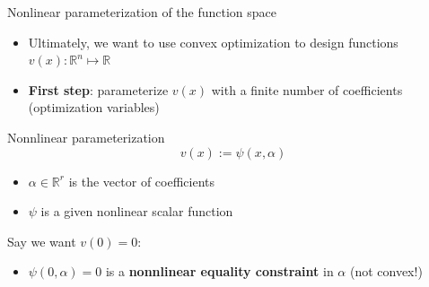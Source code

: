 \documentclass[aspectratio=169]{beamer}
\begin{document}
\begin{frame}{Nonlinear parameterization of the function space}
\begin{itemize}
\item
Ultimately, we want to use convex optimization to design functions $v(x) : \mathbb R^n \mapsto \mathbb R$
\item
\textbf{First step}: parameterize $v(x)$ with a finite number of coefficients (optimization variables)
\end{itemize}
\pause
\begin{block}{Nonnlinear parameterization}
$$
v(x) := \psi (x, \alpha)
$$
\vspace{-5mm}
\begin{itemize}
\item
$\alpha \in \mathbb R^r$ is the vector of coefficients
\item
$\psi$ is a given nonlinear scalar function
\end{itemize}
\end{block}
\pause
Say we want $v(0) = 0$:
\begin{itemize}

\item
$\psi (0, \alpha) = 0$ is a \textbf{nonnlinear equality constraint} in $\alpha$ (not convex!)
\end{itemize}
\end{frame}
\end{document}

